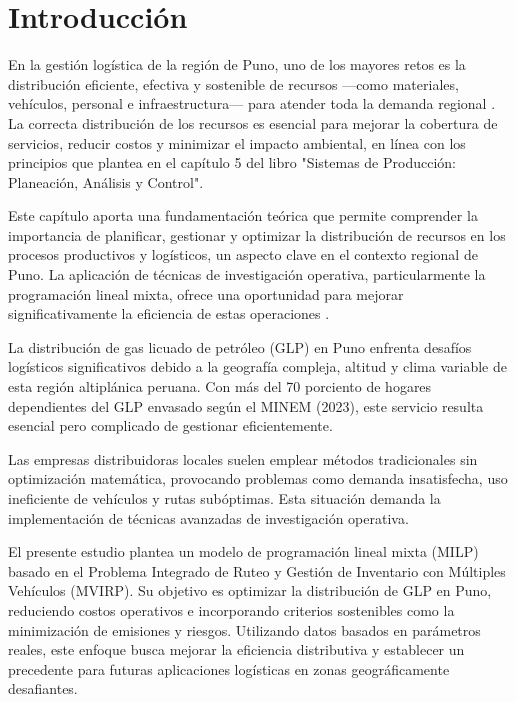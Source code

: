 \documentclass[11pt, a4paper]{article}
\begin{document}
\tableofcontents
\newpage

\section{Introducción}
En la gestión logística de la región de Puno, uno de los mayores retos es la distribución eficiente, efectiva y sostenible de recursos —como materiales, vehículos, personal e infraestructura— para atender toda la demanda regional \citep{Ballou2004}. La correcta distribución de los recursos es esencial para mejorar la cobertura de servicios, reducir costos y minimizar el impacto ambiental, en línea con los principios que plantea \citet{Nahmias2014} en el capítulo 5 del libro "Sistemas de Producción: Planeación, Análisis y Control".

Este capítulo aporta una fundamentación teórica que permite comprender la importancia de planificar, gestionar y optimizar la distribución de recursos en los procesos productivos y logísticos, un aspecto clave en el contexto regional de Puno. La aplicación de técnicas de investigación operativa, particularmente la programación lineal mixta, ofrece una oportunidad para mejorar significativamente la eficiencia de estas operaciones \citep{Winston2004}.

La distribución de gas licuado de petróleo (GLP) en Puno enfrenta desafíos logísticos significativos debido a la geografía compleja, altitud y clima variable de esta región altiplánica peruana. Con más del 70 porciento de hogares dependientes del GLP envasado según el MINEM (2023), este servicio resulta esencial pero complicado de gestionar eficientemente.

Las empresas distribuidoras locales suelen emplear métodos tradicionales sin optimización matemática, provocando problemas como demanda insatisfecha, uso ineficiente de vehículos y rutas subóptimas. Esta situación demanda la implementación de técnicas avanzadas de investigación operativa.

El presente estudio plantea un modelo de programación lineal mixta (MILP) basado en el Problema Integrado de Ruteo y Gestión de Inventario con Múltiples Vehículos (MVIRP). Su objetivo es optimizar la distribución de GLP en Puno, reduciendo costos operativos e incorporando criterios sostenibles como la minimización de emisiones y riesgos. Utilizando datos basados en parámetros reales, este enfoque busca mejorar la eficiencia distributiva y establecer un precedente para futuras aplicaciones logísticas en zonas geográficamente desafiantes.
\end{document}
